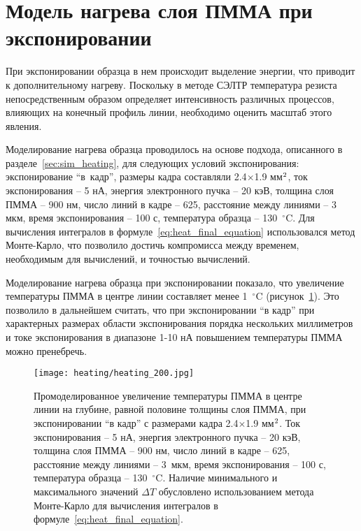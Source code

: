 \section{Модель нагрева слоя ПММА при экспонировании}

При экспонировании образца в нем происходит выделение энергии, что приводит к дополнительному нагреву. Поскольку в методе СЭЛТР температура резиста непосредственным образом определяет интенсивность различных процессов, влияющих на конечный профиль линии, необходимо оценить масштаб этого явления.

Моделирование нагрева образца проводилось на основе подхода, описанного в разделе~\ref{sec:sim_heating}, для следующих условий экспонирования: экспонирование ``в~кадр'', размеры кадра составляли 2.4$\times$1.9 мм$^\text{2}$, ток экспонирования -- 5 нА, энергия электронного пучка -- 20 кэВ, толщина слоя ПММА -- 900 нм, число линий в кадре -- 625, расстояние между линиями -- 3 мкм, время экспонирования -- 100 с, температура образца -- 130~$^\circ$C.
Для вычисления интегралов в формуле~\ref{eq:heat_final_equation} использовался метод Монте-Карло, что позволило достичь компромисса между временем, необходимым для вычислений, и точностью вычислений.

Моделирование нагрева образца при экспонировании показало, что увеличение температуры ПММА в центре линии составляет менее 1~$^\circ$C (рисунок~\ref{fig:heating}). Это позволило в дальнейшем считать, что при экспонировании ``в кадр'' при характерных размерах области экспонирования порядка нескольких миллиметров и токе экспонирования в диапазоне 1-10 нА повышением температуры ПММА можно пренебречь.

\begin{figure}[h]
	\begin{center}
		\texttt{[image: heating/heating\_200.jpg]}
	\end{center}
	\vspace{-1em}
	\caption{Промоделированное увеличение температуры ПММА в центре линии на глубине, равной половине толщины слоя ПММА, при экспонировании ``в кадр'' с размерами кадра 2.4$\times$1.9 мм$^\text{2}$. Ток экспонирования -- 5 нА, энергия электронного пучка -- 20 кэВ, толщина слоя ПММА -- 900 нм, число линий в кадре -- 625, расстояние между линиями -- 3~мкм, время экспонирования -- 100 с, температура образца -- 130~$^\circ$C. Наличие минимального и максимального значений $\Delta T$ обусловлено использованием метода Монте-Карло для вычисления интегралов в формуле~\ref{eq:heat_final_equation}.}
	\label{fig:heating}
\end{figure}




